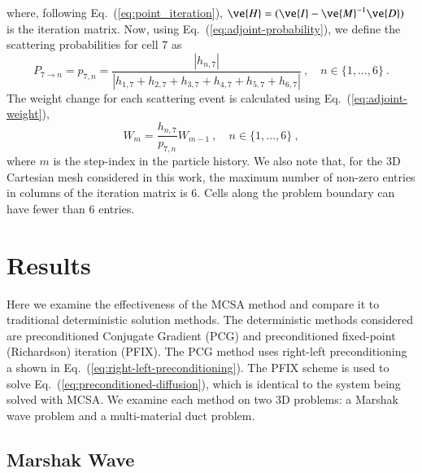 \documentclass[preprint,12pt]{elsarticle}
\newcommand{\vI}{\ensuremath{\ve{I}}}
\begin{document}
where, following Eq.~(\ref{eq:point_iteration}), $\ve{H} = (\vI -
\ve{M}^{-1}\ve{D})$ is the iteration matrix.  Now, using
Eq.~(\ref{eq:adjoint-probability}), we define the scattering
probabilities for cell 7 as
\begin{equation*}
  P_{7\rightarrow n} = p_{7,n} = \frac{|h_{n,7}|}{|h_{1,7} + 
    h_{2,7} + h_{3,7} + h_{4,7} + h_{5,7} + h_{6,7}|}\:,\quad
  n\in \{1,\ldots,6\}\:.
\end{equation*}
The weight change for each scattering event is calculated using
Eq.~(\ref{eq:adjoint-weight}),
\begin{equation*}
  W_{m} = \frac{h_{n,7}}{p_{7,n}}W_{m-1}\:,\quad
  n\in \{1,\ldots,6\}\:,
\end{equation*}
where $m$ is the step-index in the particle history.  We also note
that, for the 3D Cartesian mesh considered in this work, the maximum
number of non-zero entries in columns of the iteration matrix is 6.
Cells along the problem boundary can have fewer than 6 entries.

\section{Results}
\label{sec:results}

Here we examine the effectiveness of the MCSA method and compare it to
traditional deterministic solution methods.  The deterministic methods
considered are preconditioned Conjugate Gradient (PCG) and
preconditioned fixed-point (Richardson) iteration (PFIX).  The PCG
method uses right-left preconditioning a shown in
Eq.~(\ref{eq:right-left-preconditioning}).  The PFIX scheme is used to
solve Eq.~(\ref{eq:preconditioned-diffusion}), which is identical to
the system being solved with MCSA.  We examine each method on two 3D
problems: a Marshak wave problem and a multi-material duct problem.

\subsection{Marshak Wave}
\end{document}

